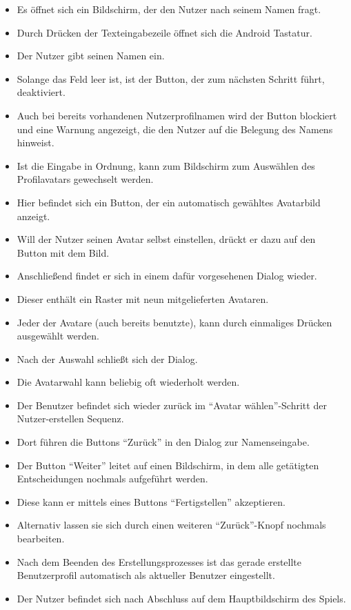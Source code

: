 \begin{itemize}
\item Es öffnet sich ein Bildschirm, der den Nutzer nach seinem Namen fragt.
\item Durch Drücken der Texteingabezeile öffnet sich die Android Tastatur.
\item Der Nutzer gibt seinen Namen ein. 
\item Solange das Feld leer ist, ist der Button, der zum nächsten Schritt führt, deaktiviert.
\item  Auch bei bereits vorhandenen Nutzerprofilnamen wird der Button blockiert und eine Warnung angezeigt,
die den Nutzer auf die Belegung des Namens hinweist. 
\item Ist die Eingabe in Ordnung, kann zum Bildschirm zum Auswählen des Profilavatars gewechselt werden.
\item Hier befindet sich ein Button, der ein automatisch gewähltes Avatarbild anzeigt.
\item Will der Nutzer seinen Avatar selbst einstellen, drückt er dazu auf den Button mit dem Bild.
\item Anschließend findet er sich in einem dafür vorgesehenen Dialog wieder.
\item Dieser enthält ein Raster mit neun mitgelieferten Avataren.
\item Jeder der Avatare (auch bereits benutzte), kann durch einmaliges Drücken ausgewählt werden.
\item Nach der Auswahl schließt sich der Dialog.
\item Die Avatarwahl kann beliebig oft wiederholt werden.
\item Der Benutzer befindet sich wieder zurück im "`Avatar wählen"'-Schritt der Nutzer-erstellen Sequenz.
\item Dort führen die Buttons "`Zurück"' in den Dialog zur Namenseingabe.
\item Der Button "`Weiter"' leitet auf einen Bildschirm, in dem alle getätigten Entscheidungen
nochmals aufgeführt werden. 
\item Diese kann er mittels eines Buttons "`Fertigstellen"' akzeptieren.
\item Alternativ lassen sie sich durch einen weiteren "`Zurück"'-Knopf 
nochmals bearbeiten.
\item Nach dem Beenden des Erstellungsprozesses ist das gerade erstellte 
Benutzerprofil automatisch als aktueller Benutzer eingestellt.
\item Der Nutzer befindet sich nach Abschluss auf dem Hauptbildschirm des Spiels.
\end{itemize}
